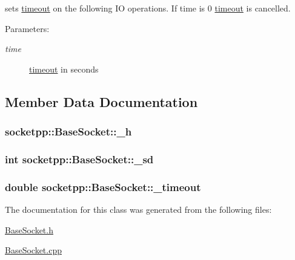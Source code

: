 sets \hyperlink{classsocketpp_1_1timeout}{timeout} on the following IO operations. If time is 0 \hyperlink{classsocketpp_1_1timeout}{timeout} is cancelled. 

\begin{Desc}
\item[Parameters:]
\begin{description}
\item[{\em time}]\hyperlink{classsocketpp_1_1timeout}{timeout} in seconds \end{description}
\end{Desc}


\subsection{Member Data Documentation}
\hypertarget{classsocketpp_1_1BaseSocket_1e44e3c6c2ecd89c2aa716cc62528620}{
\subsubsection[{\_\-h}]{ {\bf socketpp::BaseSocket::\_\-h}}}
\label{classsocketpp_1_1BaseSocket_1e44e3c6c2ecd89c2aa716cc62528620}


\hypertarget{classsocketpp_1_1BaseSocket_a5ef6b5fabb3988bced6a23d9631985d}{
\subsubsection[{\_\-sd}]{\setlength{\rightskip}{0pt plus 5cm}int {\bf socketpp::BaseSocket::\_\-sd}}}
\label{classsocketpp_1_1BaseSocket_a5ef6b5fabb3988bced6a23d9631985d}


\hypertarget{classsocketpp_1_1BaseSocket_418af5a1fe752cef38e4c6679780224c}{
\subsubsection[{\_\-timeout}]{\setlength{\rightskip}{0pt plus 5cm}double {\bf socketpp::BaseSocket::\_\-timeout}}}
\label{classsocketpp_1_1BaseSocket_418af5a1fe752cef38e4c6679780224c}




The documentation for this class was generated from the following files:\begin{CompactItemize}
\item 
\hyperlink{BaseSocket_8h}{BaseSocket.h}\item 
\hyperlink{BaseSocket_8cpp}{BaseSocket.cpp}\end{CompactItemize}
